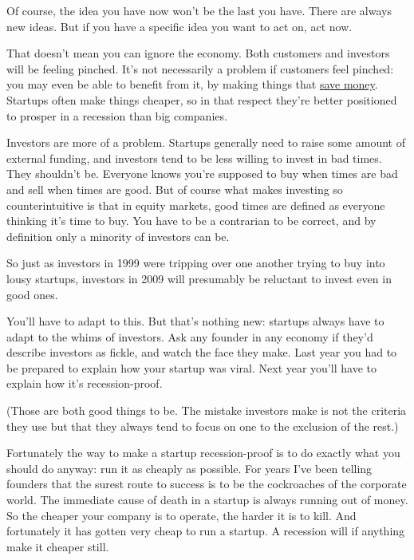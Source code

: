 Of course, the idea you have
                    now won't be the last you have. There are always new ideas.
                    But if you have a specific idea you want to act on, act
                    now.

That doesn't mean you can ignore the
                    economy. Both customers and investors will be feeling
                    pinched. It's not necessarily a problem if customers feel
                    pinched: you may even be able to benefit from it, by making
                    things that \href{http://bountii.com}{save money}.
                    Startups often make things cheaper, so in that respect
                    they're better positioned to prosper in a recession than big
                    companies.

Investors are more of a problem.
                    Startups generally need to raise some amount of external
                    funding, and investors tend to be less willing to invest in
                    bad times. They shouldn't be. Everyone knows you're supposed
                    to buy when times are bad and sell when times are good. But
                    of course what makes investing so counterintuitive is that
                    in equity markets, good times are defined as everyone
                    thinking it's time to buy. You have to be a contrarian to be
                    correct, and by definition only a minority of investors can
                    be.

So just as investors in 1999 were tripping
                    over one another trying to buy into lousy startups,
                    investors in 2009 will presumably be reluctant to invest
                    even in good ones.

You'll have to adapt to this.
                    But that's nothing new: startups always have to adapt to the
                    whims of investors. Ask any founder in any economy if they'd
                    describe investors as fickle, and watch the face they make.
                    Last year you had to be prepared to explain how your startup
                    was viral. Next year you'll have to explain how it's
                    recession-proof.

(Those are both good things to
                    be. The mistake investors make is not the criteria they use
                    but that they always tend to focus on one to the exclusion
                    of the rest.)

Fortunately the way to make a
                    startup recession-proof is to do exactly what you should do
                    anyway: run it as cheaply as possible. For years I've been
                    telling founders that the surest route to success is to be
                    the cockroaches of the corporate world. The immediate cause
                    of death in a startup is always running out of money. So the
                    cheaper your company is to operate, the harder it is to
                    kill. And fortunately it has gotten very cheap to run a
                    startup. A recession will if anything make it cheaper
                    still.

